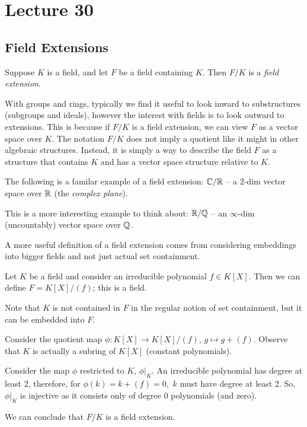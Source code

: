 \section{Lecture 30}
\subsection{Field Extensions}
\begin{definition}
  Suppose $K$ is a field, and let $F$ be a field containing $K$. Then $F/K$ is a
  \emph{field extension}.
  \label{def:fieldExt}
\end{definition}

\begin{remark}
With groups and rings, typically we find it useful to look inward to substructures (subgroups and ideals), however the interest with fields is to look outward to extensions.
This is because if $F/K$ is a field extension, we can view $F$ as a vector space over $K.$ The notation $F/K$ does not imply a quotient like it might in other algebraic structures. Instead, it is simply a way to describe the field $F$ as a structure that contains $K$ and has a vector space structure relative to $K$.
\end{remark}

\begin{example}
The following is a familar example of a field extension:
  $\mathbb C/\mathbb R$ -- a $2$-dim vector space over $\mathbb R$ (the \emph{complex plane}).

This is a more interesting example to think about:
  $\mathbb R/\mathbb Q$ -- an $\infty$-dim (uncountably) vector space over $\mathbb Q$.
\end{example}

\begin{example}
 A more useful definition of a field extension comes from considering embeddings into bigger fields and not just actual set containment.
 
  Let $K$ be a field and consider an irreducible polynomial $f\in K[X]$. Then we can define $F=K[X]/(f)$; this is a field. 

  Note that $K$ is not contained in $F$ in the regular notion of set containment, but it can be embedded into $F.$
  
  Consider the quotient map $\phi:K[X]\to K[X]/(f)$, $g\mapsto g+(f)$. Observe that
  $K$ is actually a subring of $K[X]$ (constant polynomials).

  Consider the map $\phi$ restricted to $K$, $\phi |_{K}.$
  An irreducible polynomial has degree at least 2, therefore, for $\phi(k)=k+(f)=0,$ $k$ must have degree at least 2. So, $\phi |_{K}$ is injective as it consists only of degree 0 polynomials (and zero).

  We can conclude that $F/K$ is a field extension.
\end{example}

